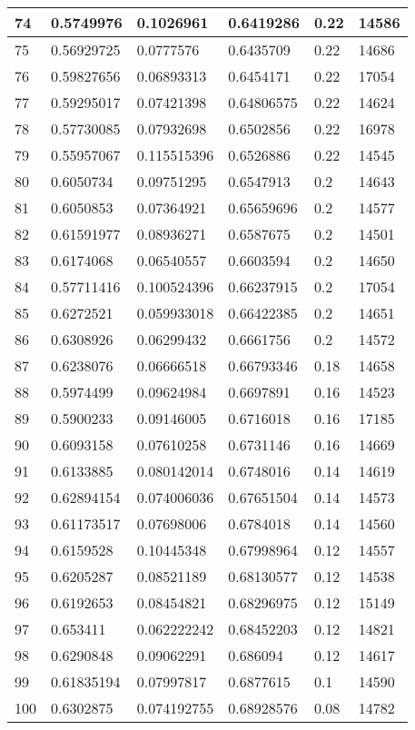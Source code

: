 \begin{longtable}{|l|l|l|l|l|l|}
74 & 0.5749976 & 0.1026961 & 0.6419286 & 0.22 & 14586 \\ \hline 
75 & 0.56929725 & 0.0777576 & 0.6435709 & 0.22 & 14686 \\ \hline 
76 & 0.59827656 & 0.06893313 & 0.6454171 & 0.22 & 17054 \\ \hline 
77 & 0.59295017 & 0.07421398 & 0.64806575 & 0.22 & 14624 \\ \hline 
78 & 0.57730085 & 0.07932698 & 0.6502856 & 0.22 & 16978 \\ \hline 
79 & 0.55957067 & 0.115515396 & 0.6526886 & 0.22 & 14545 \\ \hline 
80 & 0.6050734 & 0.09751295 & 0.6547913 & 0.2 & 14643 \\ \hline 
81 & 0.6050853 & 0.07364921 & 0.65659696 & 0.2 & 14577 \\ \hline 
82 & 0.61591977 & 0.08936271 & 0.6587675 & 0.2 & 14501 \\ \hline 
83 & 0.6174068 & 0.06540557 & 0.6603594 & 0.2 & 14650 \\ \hline 
84 & 0.57711416 & 0.100524396 & 0.66237915 & 0.2 & 17054 \\ \hline 
85 & 0.6272521 & 0.059933018 & 0.66422385 & 0.2 & 14651 \\ \hline 
86 & 0.6308926 & 0.06299432 & 0.6661756 & 0.2 & 14572 \\ \hline 
87 & 0.6238076 & 0.06666518 & 0.66793346 & 0.18 & 14658 \\ \hline 
88 & 0.5974499 & 0.09624984 & 0.6697891 & 0.16 & 14523 \\ \hline 
89 & 0.5900233 & 0.09146005 & 0.6716018 & 0.16 & 17185 \\ \hline 
90 & 0.6093158 & 0.07610258 & 0.6731146 & 0.16 & 14669 \\ \hline 
91 & 0.6133885 & 0.080142014 & 0.6748016 & 0.14 & 14619 \\ \hline 
92 & 0.62894154 & 0.074006036 & 0.67651504 & 0.14 & 14573 \\ \hline 
93 & 0.61173517 & 0.07698006 & 0.6784018 & 0.14 & 14560 \\ \hline 
94 & 0.6159528 & 0.10445348 & 0.67998964 & 0.12 & 14557 \\ \hline 
95 & 0.6205287 & 0.08521189 & 0.68130577 & 0.12 & 14538 \\ \hline 
96 & 0.6192653 & 0.08454821 & 0.68296975 & 0.12 & 15149 \\ \hline 
97 & 0.653411 & 0.062222242 & 0.68452203 & 0.12 & 14821 \\ \hline 
98 & 0.6290848 & 0.09062291 & 0.686094 & 0.12 & 14617 \\ \hline 
99 & 0.61835194 & 0.07997817 & 0.6877615 & 0.1 & 14590 \\ \hline 
100 & 0.6302875 & 0.074192755 & 0.68928576 & 0.08 & 14782 \\ \hline 
\end{longtable}
